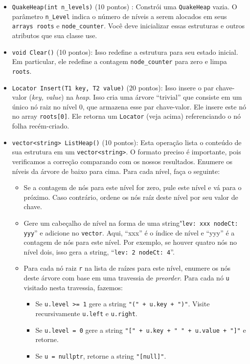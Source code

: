 \documentclass{article}
\begin{document}
\begin{itemize}
    \item  \texttt{QuakeHeap(int n\_levels)} (10 pontos) : Constrói uma \texttt{QuakeHeap} vazia. O parâmetro \texttt{n\_Level} indica o número de níveis a serem alocados em seus \texttt{arrays roots} e \texttt{node\_counter}. Você deve inicializar essas estruturas e outros atributos que sua classe use.
    \item \texttt{void Clear()}  (10 pontos): Isso redefine a estrutura para seu estado inicial. Em particular, ele redefine a contagem \texttt{node\_counter} para zero e limpa \texttt{roots}.
    \item \texttt{Locator Insert(T1 key, T2 value)}  (20 pontos):  Isso insere o par chave-valor (\textit{key, value}) na \textit{heap}. Isso cria uma árvore “trivial” que consiste em um único nó raiz no nível 0, que armazena esse par chave-valor. Ele insere este nó no array \texttt{roots[0]}. Ele retorna um \texttt{Locator} (veja acima) referenciando o nó folha recém-criado.
    \item \texttt{vector<string> ListHeap()}  (10 pontos): Esta operação lista o conteúdo de sua estrutura em um \texttt{vector<string>}. O formato preciso é importante, pois verificamos a correção comparando com os nossos resultados. Enumere os níveis da árvore de baixo para cima. Para cada nível, faça o seguinte:
    \begin{itemize}
        \item Se a contagem de nós para este nível for zero, pule este nível e vá para o próximo. Caso contrário, ordene os nós raíz deste nível por seu valor de chave.
        \item Gere um cabeçalho de nível na forma de uma string"\texttt{{lev: xxx nodeCt: yyy}}” e adicione no \texttt{vector}. Aqui, “xxx” é o índice de nível e “yyy” é a contagem de nós para este nível. Por exemplo, se houver quatro nós no nível dois, isso gera a string, “\texttt{{lev: 2 nodeCt: 4}}”.
        \item  Para cada nó raiz \texttt{r} na lista de raízes para este nível, enumere os nós deste árvore com base em uma travessia de \textit{preorder}. Para cada nó \texttt{u} visitado nesta travessia, fazemos:
        \begin{itemize}
            \item Se \texttt{u.level >= 1} gere a string \texttt{"(" + u.key + ")"}. Visite recursivamente \texttt{u.left} e \texttt{u.right}. 
            \item Se \texttt{u.level = 0} gere a string \texttt{"[" + u.key + " " + u.value + "]"} e retorne.
            \item Se \texttt{u = nullptr}, retorne a string \texttt{"[null]"}.
        \end{itemize}
    \end{itemize}
\end{itemize}
\end{document}
